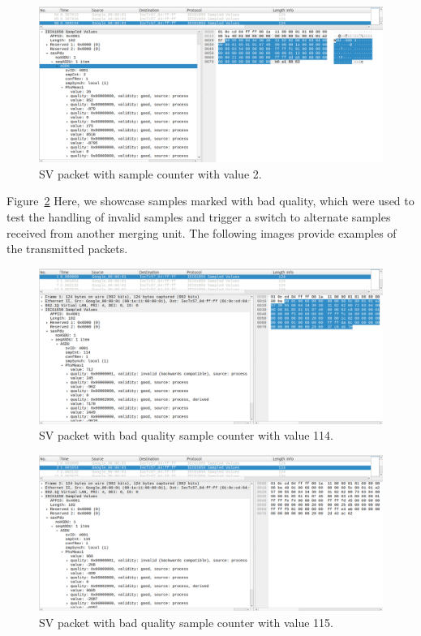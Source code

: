 \begin{figure}[tbh!]
	\centering
	\includegraphics[width=1.00\textwidth, keepaspectratio]{ch6/assets/sv_seq_3.png} %
	\caption{SV packet with sample counter with value 2.}
	\label{fig:sv_seq_3}
\end{figure}

Figure~\ref{fig:sv_seq_bad_1} Here, we showcase samples marked with bad quality, which were used to test the handling of invalid samples and trigger a switch to alternate samples received from another merging unit. The following images provide examples of the transmitted packets.

\begin{figure}[tbh!]
	\centering
	\includegraphics[width=1.00\textwidth, keepaspectratio]{ch6/assets/sv_seq_bad_1.png} %
	\caption{SV packet with bad quality sample counter with value 114.}
	\label{fig:sv_seq_bad_1}
\end{figure}

\begin{figure}[tbh!]
	\centering
	\includegraphics[width=1.00\textwidth, keepaspectratio]{ch6/assets/sv_seq_bad_2.png} %
	\caption{SV packet with bad quality sample counter with value 115.}
	\label{fig:sv_seq_bad_2}
\end{figure}

